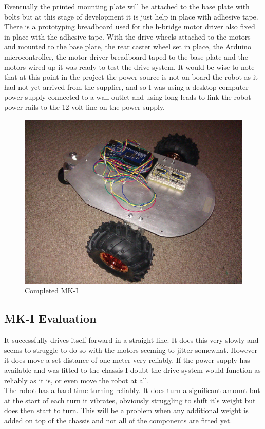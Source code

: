 Eventually the printed mounting plate will be attached to the base plate with bolts but at this stage of development it is just help in place with adhesive tape.  There is a prototyping breadboard used for the h-bridge motor driver also fixed in place with the adhesive tape. With the drive wheels attached to the motors and mounted to the base plate, the rear caster wheel set in place, the Arduino microcontroller, the motor driver breadboard taped to the base plate and the motors wired up it was ready to test the drive system.  It would be wise to note that at this point in the project the power source is not on board the robot as it had not yet arrived from the supplier, and so I was using a desktop computer power supply connected to a wall outlet and using long leads to link the robot power rails to the 12 volt line on the power supply.
\begin{figure}[H]
\centering
        \includegraphics[width=5.0in]  {Images/tria-mkII.jpg}
        \caption{Completed MK-I}
        \label{Completed MK-I}
\end{figure}
\subsection{MK-I Evaluation}
It successfully drives itself forward in a straight line.  It does this very slowly and seems to struggle to do so with the motors seeming to jitter somewhat.  However it does move a set distance of one meter very reliably.  If the power supply has available and was fitted to the chassis I doubt the drive system would function as reliably as it is, or even move the robot at all.
\\The robot has a hard time turning reliably.  It does turn a significant amount but at the start of each turn it vibrates, obviously struggling to shift it's weight but does then start to turn.  This will be a problem when any additional weight is added on top of the chassis and not all of the components are fitted yet.
